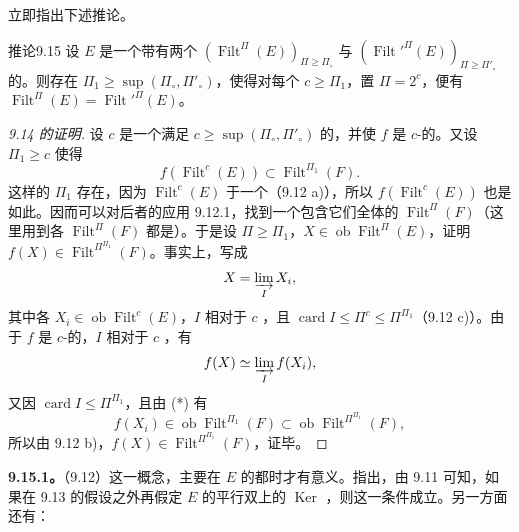 立即指出下述推论。

\begin{SGAresult}{推论}{9.15}
设 $E$ 是一个带有两个 $(\operatorname{Filt}^\Pi(E))_{\Pi\geq\Pi_\circ}$ 与 $(\operatorname{Filt}'^\Pi(E))_{\Pi\geq\Pi'_\circ}$ 的。则存在 $\Pi_1\geq\sup(\Pi_\circ,\Pi'_\circ)$，使得对每个 $c\geq\Pi_1$，置 $\Pi=2^c$，便有 $\operatorname{Filt}^\Pi(E)=\operatorname{Filt}'^\Pi(E)$。
\end{SGAresult}

\begin{proof}[9.14 的证明]
设 $c$ 是一个满足 $c\geq\sup(\Pi_\circ,\Pi'_\circ)$ 的，并使 $f$ 是 $c$-的。又设 $\Pi_1\geq c$ 使得
\[
f(\operatorname{Filt}^c(E))\subset\operatorname{Filt}^{\Pi_1}(F).\tag{*}
\]
这样的 $\Pi_1$ 存在，因为 $\operatorname{Filt}^c(E)$ 于一个（9.12 a)），所以 $f(\operatorname{Filt}^c(E))$ 也是如此。因而可以对后者的应用 9.12.1，找到一个包含它们全体的 $\operatorname{Filt}^\Pi(F)$（这里用到各 $\operatorname{Filt}^\Pi(F)$ 都是）。于是设 $\Pi\geq\Pi_1$，$X\in\operatorname{ob}\operatorname{Filt}^\Pi(E)$，证明 $f(X)\in\operatorname{Filt}^{\Pi^{\Pi_1}}(F)$。事实上，写成
\[
X=\varinjlim_I X_i,
\]
其中各 $X_i\in\operatorname{ob}\operatorname{Filt}^c(E)$，$I$ 相对于 $c$ ，且 $\operatorname{card}I\leq\Pi^c\leq\Pi^{\Pi_1}$（9.12 c)）。由于 $f$ 是 $c$-的，$I$ 相对于 $c$ ，有
\[
f(X)\simeq\varinjlim_I f(X_i),
\]
又因 $\operatorname{card}I\leq\Pi^{\Pi_1}$，且由 (*) 有
\[
f(X_i)\in\operatorname{ob}\operatorname{Filt}^{\Pi_1}(F)
\subset\operatorname{ob}\operatorname{Filt}^{\Pi^{\Pi_1}}(F),
\]
所以由 9.12 b)，$f(X)\in\operatorname{Filt}^{\Pi^{\Pi_1}}(F)$，证毕。
\end{proof}

\textbf{9.15.1。}（9.12）这一概念，主要在 $E$ 的都时才有意义。指出，由 9.11 可知，如果在 9.13 的假设之外再假定 $E$ 的平行双上的 $\operatorname{Ker}$ ，则这一条件成立。另一方面还有：


